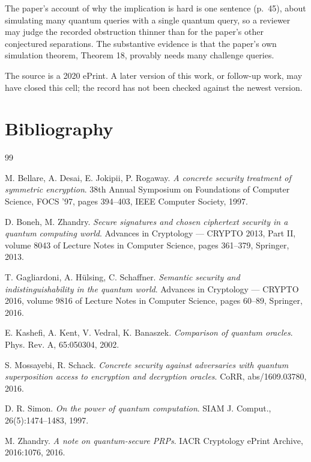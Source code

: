 \documentclass{conjura-conjecture}
\begin{document}
\begin{remark}\label{rem:obstruction}
The paper's account of why the implication is hard is one sentence
(p.~45), about simulating many quantum queries with a single quantum
query, so a reviewer may judge the recorded obstruction thinner than for
the paper's other conjectured separations. The substantive evidence is
that the paper's own simulation theorem, Theorem 18, provably needs many
challenge queries.
\end{remark}

\begin{remark}\label{rem:currency}
The source is a 2020 ePrint. A later version of this work, or follow-up
work, may have closed this cell; the record has not been checked against
the newest version.
\end{remark}

\section{Bibliography}

\begin{conjurabibliography}{99}

M. Bellare, A. Desai, E. Jokipii, P. Rogaway.
\emph{A concrete security treatment of symmetric encryption}.
38th Annual Symposium on Foundations of Computer Science, FOCS '97,
pages 394--403, IEEE Computer Society, 1997.

D. Boneh, M. Zhandry.
\emph{Secure signatures and chosen ciphertext security in a quantum
computing world}.
Advances in Cryptology --- CRYPTO 2013, Part II, volume 8043 of Lecture
Notes in Computer Science, pages 361--379, Springer, 2013.

T. Gagliardoni, A. H\"ulsing, C. Schaffner.
\emph{Semantic security and indistinguishability in the quantum world}.
Advances in Cryptology --- CRYPTO 2016, volume 9816 of Lecture Notes in
Computer Science, pages 60--89, Springer, 2016.

E. Kashefi, A. Kent, V. Vedral, K. Banaszek.
\emph{Comparison of quantum oracles}.
Phys. Rev. A, 65:050304, 2002.

S. Mossayebi, R. Schack.
\emph{Concrete security against adversaries with quantum superposition
access to encryption and decryption oracles}.
CoRR, abs/1609.03780, 2016.

D. R. Simon.
\emph{On the power of quantum computation}.
SIAM J. Comput., 26(5):1474--1483, 1997.

M. Zhandry.
\emph{A note on quantum-secure PRPs}.
IACR Cryptology ePrint Archive, 2016:1076, 2016.

\end{conjurabibliography}
\end{document}
